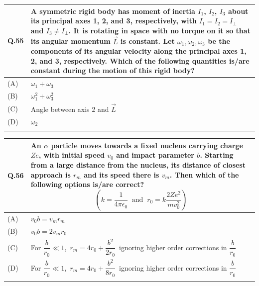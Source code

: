 \documentclass[12pt,a4paper]{article}
\begin{document}
\begin{table}[h!]
\begin{tabular}{|p{}|p{}|}
\hline
\textbf{Q.55} &
A symmetric rigid body has moment of inertia $I_1$, $I_2$, $I_3$ about its principal axes 1, 2, and 3, respectively, with $I_1 = I_2 = I_\perp$ and $I_3 \neq I_\perp$. It is rotating in space with no torque on it so that its angular momentum $\vec{L}$ is constant. Let $\omega_1, \omega_2, \omega_3$ be the components of its angular velocity along the principal axes 1, 2, and 3, respectively. Which of the following quantities is/are constant during the motion of this rigid body? \\
\hline
(A) & $\omega_1 + \omega_3$ \\
\hline
(B) & $\omega_1^2 + \omega_3^2$ \\
\hline
(C) & Angle between axis 2 and $\vec{L}$ \\
\hline
(D) & $\omega_2$ \\
\hline
& \\
\hline
\end{tabular}
\end{table}

\bigskip

\begin{table}[h!]
\begin{tabular}{|p{}|p{}|}
\hline
\textbf{Q.56} &
An $\alpha$ particle moves towards a fixed nucleus carrying charge $Ze$, with initial speed $v_0$ and impact parameter $b$. Starting from a large distance from the nucleus, its distance of closest approach is $r_m$ and its speed there is $v_m$. Then which of the following options is/are correct?
\[
\left(k = \frac{1}{4\pi\epsilon_0}\ \text{ and }\ r_0 = k\frac{2Ze^2}{mv_0^2}\right)
\] \\
\hline
(A) & \rule{0pt}{1.2cm} $v_0 b = v_m r_m$ \\[8pt]
\hline
(B) & \rule{0pt}{1.2cm} $v_0 b = 2v_m r_0$ \\[8pt]
\hline
(C) & \rule{0pt}{1.2cm}  For $\dfrac{b}{r_0} \ll 1$,\ $r_m = 4r_0 + \dfrac{b^2}{2r_0}$\ ignoring higher order corrections in $\dfrac{b}{r_0}$ \\[8pt]
\hline
(D) & \rule{0pt}{1.2cm} For $\dfrac{b}{r_0} \ll 1$,\ $r_m = 4r_0 + \dfrac{b^2}{8r_0}$\ ignoring higher order corrections in $\dfrac{b}{r_0}$ \\[8pt]
\hline
& \\
\hline
\end{tabular}
\end{table}
\end{document}
